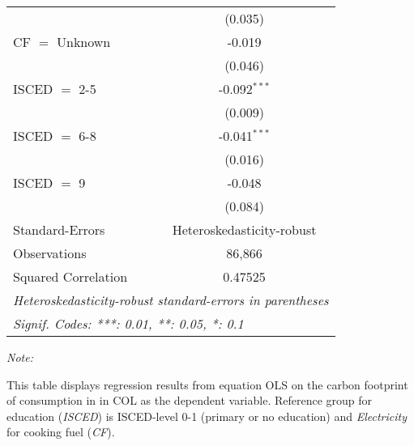 \begin{table}[htbp!]
\begin{adjustbox}{width = 1\textwidth, max height = 0.95\textheight, center}
\begin{threeparttable}[b]
\begin{tabular}{lc}
                                & (0.035)\\   
            CF $=$ Unknown      & -0.019\\   
                                & (0.046)\\   
            ISCED $=$ 2-5       & -0.092$^{***}$\\   
                                & (0.009)\\   
            ISCED $=$ 6-8       & -0.041$^{***}$\\   
                                & (0.016)\\   
            ISCED $=$ 9         & -0.048\\   
                                & (0.084)\\   
            \midrule 
            Standard-Errors     & Heteroskedasticity-robust \\   
            Observations        & 86,866\\  
            Squared Correlation & 0.47525\\  
            \midrule \midrule
            \multicolumn{2}{l}{\emph{Heteroskedasticity-robust standard-errors in parentheses}}\\
            \multicolumn{2}{l}{\emph{Signif. Codes: ***: 0.01, **: 0.05, *: 0.1}}\\
         \end{tabular}
         
         \begin{tablenotes}\item \medskip \textit{Note:}
            \item This table displays regression results from equation OLS on the carbon footprint of consumption in  in COL as the dependent variable.  Reference group for education (\textit{ISCED}) is ISCED-level 0-1 (primary or no education) and \textit{Electricity} for cooking fuel (\textit{CF}).
         \end{tablenotes}
      \end{threeparttable}
   \end{adjustbox}
\end{table}


